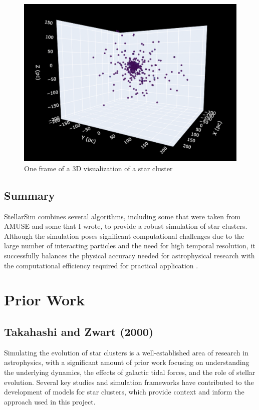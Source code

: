 \documentclass[10pt,twocolumn]{article}
\begin{document}
    \begin{figure}
            \centering
            \includegraphics[width=\linewidth]{3DAnimation.png}
            \caption{One frame of a 3D visualization of a star cluster}
            \label{fig:One frame of a 3D visualization of a star cluster}
    \end{figure}


\subsection{Summary}
StellarSim combines several algorithms, including some that were taken from AMUSE and some that I wrote, to provide a robust simulation of star clusters. Although the simulation poses significant computational challenges due to the large number of interacting particles and the need for high temporal resolution, it successfully balances the physical accuracy needed for astrophysical research with the computational efficiency required for practical application \cite{portegies2009newastronomy}.

\section{Prior Work}

\subsection{Takahashi and Zwart (2000)}
Simulating the evolution of star clusters is a well-established area of research in astrophysics, with a significant amount of prior work focusing on understanding the underlying dynamics, the effects of galactic tidal forces, and the role of stellar evolution. Several key studies and simulation frameworks have contributed to the development of models for star clusters, which provide context and inform the approach used in this project.
\end{document}
